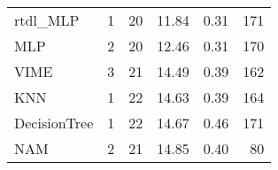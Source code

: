 \begin{tabular}{lrrrrr}
rtdl_MLP           &                  1 &  20 &  11.84 &                           0.31 &   171 \\
MLP                &                  2 &  20 &  12.46 &                           0.31 &   170 \\
VIME               &                  3 &  21 &  14.49 &                           0.39 &   162 \\
KNN                &                  1 &  22 &  14.63 &                           0.39 &   164 \\
DecisionTree       &                  1 &  22 &  14.67 &                           0.46 &   171 \\
NAM                &                  2 &  21 &  14.85 &                           0.40 &    80 \\
\bottomrule
\end{tabular}
